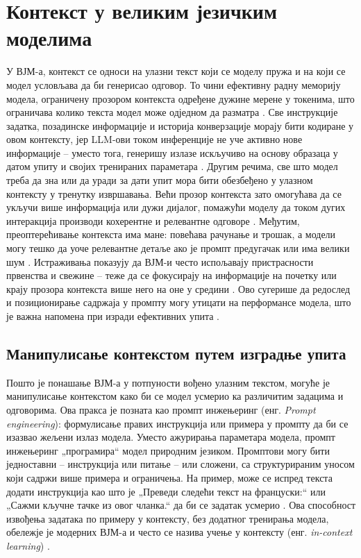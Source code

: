 \documentclass[a4paper, 12pt, master, utf8]{etf}
\begin{document}
\section{Контекст у великим језичким моделима}
\label{sec:llm_context}

У ВЈМ-а, контекст се односи на улазни текст који се моделу пружа и на који се модел условљава да би генерисао одговор. То чини ефективну радну меморију модела, ограничену прозором контекста одређене дужине мерене у токенима, што ограничава колико текста модел може одједном да разматра \cite{martineau_whats_2024}. Све инструкције задатка, позадинске информације и историја конверзације морају бити кодиране у овом контексту, јер LLM-ови током инференције не уче активно нове информације – уместо тога, генеришу излазе искључиво на основу образаца у датом упиту и својих тренираних параметара \cite{martineau_whats_2024}. Другим речима, све што модел треба да зна или да уради за дати упит мора бити обезбеђено у улазном контексту у тренутку извршавања. Већи прозор контекста зато омогућава да се укључи више информација или дужи дијалог, помажући моделу да током дугих интеракција производи кохерентне и релевантне одговоре \cite{martineau_whats_2024}. Међутим, преоптерећивање контекста има мане: повећава рачунање и трошак, а модели могу тешко да уоче релевантне детаље ако је промпт предугачак или има велики шум \cite{liu_lost_2023}. Истраживања показују да ВЈМ-и често испољавају пристрасности првенства и свежине – теже да се фокусирају на информације на почетку или крају прозора контекста више него на оне у средини \cite{liu_lost_2023}. Ово сугерише да редослед и позиционирање садржаја у промпту могу утицати на перформансе модела, што је важна напомена при изради ефективних упита \cite{liu_lost_2023}.

\subsection{Манипулисање контекстом путем изградње упита}

Пошто је понашање ВЈМ-а у потпуности вођено улазним текстом, могуће је манипулисање контекстом како би се модел усмерио ка различитим задацима и одговорима. Ова пракса је позната као промпт инжењеринг (енг. \textit{Prompt engineering}): формулисање правих инструкција или примера у промпту да би се изазвао жељени излаз модела. Уместо ажурирања параметара модела, промпт инжењеринг „програмира“ модел природним језиком. Промптови могу бити једноставни – инструкција или питање – или сложени, са структурираним уносом који садржи више примера и ограничења. На пример, може се испред текста додати инструкција као што је „Преведи следећи текст на француски:“ или „Сажми кључне тачке из овог чланка.“ да би се задатак усмерио \cite{sahoo_systematic_2025}. Ова способност извођења задатака по примеру у контексту, без додатног тренирања модела, обележје је модерних ВЈМ-а и често се назива учење у контексту (енг. \textit{in-context learning}) \cite{sahoo_systematic_2025}.
\end{document}
